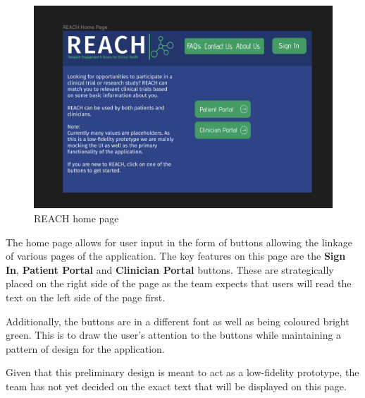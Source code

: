 \documentclass[12pt, titlepage]{article}
\begin{document}
\begin{figure}[H]
  \centering
  \includegraphics[width=0.9\linewidth]{images/HomePage.png}
  \caption{REACH home page}
  \label{fig:figure1}
\end{figure}
The home page allows for user input in the form of buttons allowing the linkage of 
various pages of the application. The key features on this page are the \textbf{Sign In},
\textbf{Patient Portal} and \textbf{Clinician Portal} buttons.
These are strategically placed on the right side of the page as the team expects
that users will read the text on the left side of the page first.

Additionally, the buttons are in a different font as well as being
coloured bright green. This is to draw the user's attention to the buttons
while maintaining a pattern of design for the application.

Given that this preliminary design is meant to act as a low-fidelity prototype, 
the team has not yet decided on the exact text that will be displayed on this page. 
\end{document}
